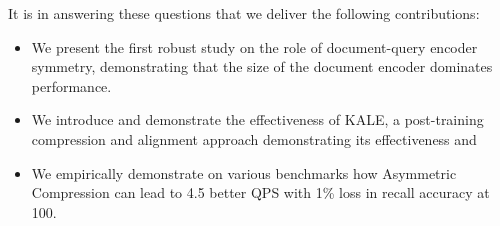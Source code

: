 It is in answering these questions that we deliver the following contributions: 
\begin{itemize}
\item We present the first robust study on the role of document-query encoder symmetry, demonstrating that the size of the document encoder dominates performance. 
\item We introduce and demonstrate the effectiveness of KALE, a post-training compression and alignment approach demonstrating its effectiveness and 
\item We empirically demonstrate on various benchmarks how Asymmetric Compression can lead to 4.5 better QPS with 1\% loss in recall accuracy at 100.
\end{itemize}